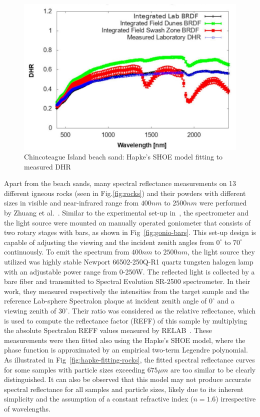 \begin{figure}[!tb]
    \centering
    \includegraphics[width=0.9\linewidth]{./figures/measurement-literature/hapke-fitting-island.png}
    \caption{Chincoteague Island beach sand: Hapke's SHOE model fitting to measured DHR}
    \label{fig:hapke-fitting-sand}
\end{figure}

Apart from the beach sands, many spectral reflectance measurements on 13 different igneous rocks (seen in Fig.\ref{fig:rocks}) and their powders with different sizes in visible and near-infrared range from $400nm$ to $2500nm$ were performed by Zhuang et al.~\cite{2023_Zhuang}.
Similar to the experimental set-up in~\cite{2022_Wise},  the spectrometer and the light source were mounted on manually operated goniometer that consists of two rotary stages with bars, as shown in Fig~\ref{fig:gonio-bars}.
This set-up design is capable of adjusting the viewing and the incident zenith angles from $0^\circ$ to $70^\circ$ continuously.
To emit the spectrum from $400nm$ to $2500nm$, the light source they utilized was highly stable Newport 66502-250Q-R1 quartz tungsten halogen lamp with an adjustable power range from 0-250W.
The reflected light is collected by a bare fiber and transmitted to Spectral Evolution SR-2500 spectrometer.
In their work, they measured respectively the intensities from the target sample and the reference Lab-sphere Spectralon plaque at incident zenith angle of $0^\circ$ and a viewing zenith of $30^\circ$.
Their ratio was considered as the relative reflectance, which is used to compute the reflectance factor (REFF) of this sample by multiplying the absolute Spectralon REFF values measured by RELAB~\cite{2023_Zhuang}.
These measurements were then fitted also using the Hapke's SHOE model, where the phase function is approximated by an empirical two-term Legendre polynomial.
As illustrated in Fig~\ref{fig:hapke-fitting-rocks}, the fitted spectral reflectance curves for some samples with particle sizes exceeding $675\mu m$ are too similar to be clearly distinguished.
It can also be observed that this model may not produce accurate spectral reflectance for all samples and particle sizes, likely due to its inherent simplicity and the assumption of a constant refractive index ($n = 1.6$) irrespective of wavelengths.

